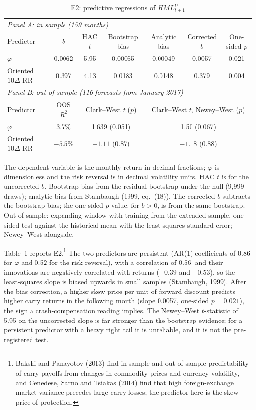 \documentclass[11pt]{article}
\theoremstyle{result}
\newcommand{\HML}{\mathit{HML}}
\newcommand{\D}{\Delta}
\begin{document}
\begin{table}[t]
\centering\footnotesize
\setlength{\tabcolsep}{4pt}
\caption{E2: predictive regressions of $\HML^U_{t+1}$}\label{tab:e2}
\begin{tabular}{lcccccc}
\toprule
\multicolumn{7}{l}{\emph{Panel A: in sample (159 months)}}\\
Predictor & $b$ & HAC $t$ & Bootstrap bias & Analytic bias & Corrected $b$ & One-sided $p$ \\
\midrule
$\varphi$ & 0.0062 & 5.95 & 0.00055 & 0.00049 & 0.0057 & 0.021 \\
Oriented $10\D$ RR & 0.397 & 4.13 & 0.0183 & 0.0148 & 0.379 & 0.004 \\
\midrule
\multicolumn{7}{l}{\emph{Panel B: out of sample (116 forecasts from January 2017)}}\\
Predictor & OOS $R^2$ & \multicolumn{2}{c}{Clark--West $t$ ($p$)} & \multicolumn{3}{c}{Clark--West $t$, Newey--West ($p$)} \\
\midrule
$\varphi$ & 3.7\% & \multicolumn{2}{c}{1.639 (0.051)} & \multicolumn{3}{c}{1.50 (0.067)} \\
Oriented $10\D$ RR & $-5.5$\% & \multicolumn{2}{c}{$-1.11$ (0.87)} & \multicolumn{3}{c}{$-1.18$ (0.88)} \\
\bottomrule
\end{tabular}
\par\medskip
\begin{minipage}{0.97\linewidth}\footnotesize
The dependent variable is the monthly return in decimal fractions; $\varphi$ is dimensionless and the risk reversal is in decimal volatility units. HAC $t$ is for the uncorrected $b$. Bootstrap bias from the residual bootstrap under the null (9,999 draws); analytic bias from Stambaugh (1999, eq.~(18)). The corrected $b$ subtracts the bootstrap bias; the one-sided $p$-value, for $b>0$, is from the same bootstrap. Out of sample: expanding window with training from the extended sample, one-sided test against the historical mean with the least-squares standard error; Newey--West alongside.
\end{minipage}
\end{table}

Table~\ref{tab:e2} reports E2.\footnote{Bakshi and Panayotov (2013) find in-sample and out-of-sample predictability of carry payoffs from changes in commodity prices and currency volatility, and Cenedese, Sarno and Tsiakas (2014) find that high foreign-exchange market variance precedes large carry losses; the predictor here is the skew price of protection.} The two predictors are persistent (AR(1) coefficients of 0.86 for $\varphi$ and 0.52 for the risk reversal), with a correlation of 0.56, and their innovations are negatively correlated with returns ($-0.39$ and $-0.53$), so the least-squares slope is biased upwards in small samples (Stambaugh, 1999). After the bias correction, a higher skew price per unit of forward discount predicts higher carry returns in the following month (slope 0.0057, one-sided $p=0.021$), the sign a crash-compensation reading implies. The Newey--West $t$-statistic of 5.95 on the uncorrected slope is far stronger than the bootstrap evidence; for a persistent predictor with a heavy right tail it is unreliable, and it is not the pre-registered test.
\end{document}
